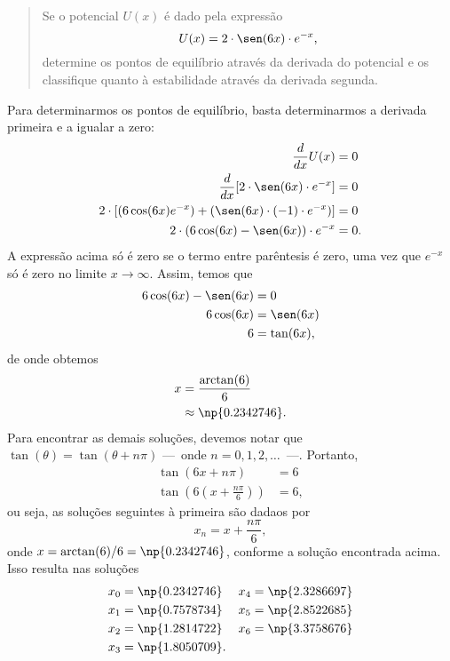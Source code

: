 \begin{quote}
    Se o potencial $U(x)$ é dado pela expressão
    \begin{equation}
        U(x) = 2\cdot\sen(6x)\cdot e^{-x},
    \end{equation}
    determine os pontos de equilíbrio através da derivada do potencial e os classifique quanto à estabilidade através da derivada segunda.
\end{quote}

Para determinarmos os pontos de equilíbrio, basta determinarmos a derivada primeira e a igualar a zero:
\begin{align}
    \frac{d}{dx} U(x) &= 0 \\
    \frac{d}{dx} [2\cdot\sen(6x)\cdot e^{-x}] &= 0 \\
    2\cdot[(6\cos(6x)e^{-x}) + (\sen(6x)\cdot (-1) \cdot e^{-x})] &= 0 \\
    2\cdot(6\cos(6x) - \sen(6x))\cdot e^{-x} &= 0.
\end{align}
%
A expressão acima só é zero se o termo entre parêntesis é zero, uma vez que $e^{-x}$ só é zero no limite $x \to \infty$. Assim, temos que
\begin{align}
    6\cos(6x) - \sen(6x) &= 0 \\
    6\cos(6x) &= \sen(6x) \\
    6 &= \tan(6x),
\end{align}
%
de onde obtemos
\begin{align}
    x &= \frac{\arctan(6)}{6} \\
    &\approx \np{0.2342746}.
\end{align}
%
Para encontrar as demais soluções, devemos notar que $\tan(\theta) = \tan(\theta + n\pi)$ ---~onde $n = 0, 1, 2, \dots$~---. Portanto,
\begin{align}
    \tan(6x + n\pi) &= 6 \\
    \tan\left(6\left(x + \frac{n\pi}{6}\right)\right) &= 6,
\end{align}
%
ou seja, as soluções seguintes à primeira são dadaos por
\begin{equation}
    x_n = x + \frac{n\pi}{6},
\end{equation}
%
onde $x = \arctan(6)/ 6 = \np{0.2342746}$, conforme a solução encontrada acima. Isso resulta nas soluções
\begin{align*}
x_0 &= \np{0.2342746} & x_4 &= \np{2.3286697} \\
x_1 &= \np{0.7578734} & x_5 &= \np{2.8522685} \\
x_2 &= \np{1.2814722} & x_6 &= \np{3.3758676} \\
x_3 &= \np{1.8050709}.
\end{align*}


